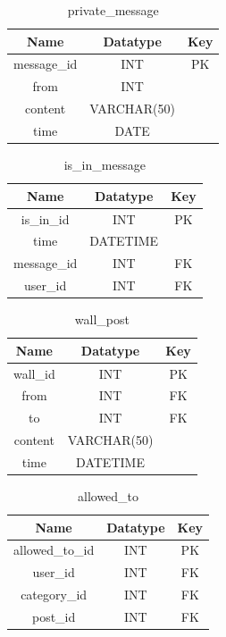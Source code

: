 \begin{table}[!ht]
\caption{private\_message}
\centering
\begin{tabular}{c c c}
\hline\hline
Name               & Datatype    & Key \\
\hline
message\_id        & INT         & PK  \\
from               & INT         &     \\
content            & VARCHAR(50) &     \\
time               & DATE        &     \\
\hline
\end{tabular}
\label{table:nonlin}
\end{table}

\begin{table}[!ht]
\caption{is\_in\_message}
\centering
\begin{tabular}{c c c}
\hline\hline
Name               & Datatype        & Key \\
\hline
is\_in\_id         & INT             & PK  \\
time               & DATETIME        &     \\
message\_id        & INT             & FK  \\
user\_id           & INT             & FK  \\
\hline
\end{tabular}
\label{table:nonlin}
\end{table}

\begin{table}[!ht]
\caption{wall\_post}
\centering
\begin{tabular}{c c c}
\hline\hline
Name                    & Datatype    & Key \\
\hline
wall\_id                & INT         & PK  \\
from                    & INT         & FK  \\
to                      & INT         & FK  \\
content                 & VARCHAR(50) &     \\
time                    & DATETIME    &     \\
\hline
\end{tabular}
\label{table:nonlin}
\end{table}

\begin{table}[!ht]
\caption{allowed\_to}
\centering
\begin{tabular}{c c c}
\hline\hline
Name                    & Datatype    & Key \\
\hline
allowed\_to\_id         & INT         & PK  \\
user\_id                & INT         & FK  \\
category\_id            & INT         & FK  \\
post\_id                & INT         & FK  \\
\hline
\end{tabular}
\label{table:nonlin}
\end{table}

